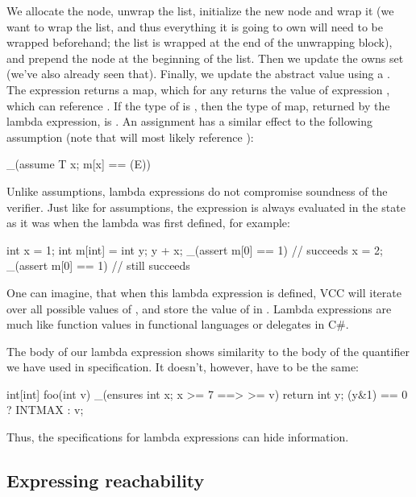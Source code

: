 \noindent
We allocate the node, unwrap the list, initialize the new node
and wrap it (we want to wrap the list, and thus everything it is going to own will
need to be wrapped beforehand; the list is wrapped at the end of the 
unwrapping block), and
prepend the node at the beginning of the list.
Then we update the owns set (we've also already seen that).
Finally, we update the abstract value using a .
The expression  returns a map, which for
any  returns the value of expression ,
which can reference .
If the type of  is , then the type of map, returned by the
lambda expression, is .
An assignment  has a similar effect to
the following assumption (note that  will most likely reference ):
\begin{VCC}
_(assume \forall T x; m[x] == (E))
\end{VCC}
\noindent
Unlike assumptions, lambda expressions do not compromise 
soundness of the verifier.
Just like for assumptions,
the expression is always evaluated in the state as it was
when the lambda was first defined, for example:
\begin{VCC}
int x = 1;
int m[int] = \lambda int y; y + x;
_(assert m[0] == 1) // succeeds
x = 2;
_(assert m[0] == 1) // still succeeds
\end{VCC}
One can imagine, that when this lambda expression is defined,
VCC will iterate over all possible values of ,
and store the value of  in .
Lambda expressions are much like function values in functional
languages or delegates in C\#.

\begin{note}
The body of our lambda expression shows similarity to the body
of the quantifier we have used in specification.
It doesn't, however, have to be the same:
\begin{VCC}
int[int] foo(int v)
  _(ensures \forall int x; x >= 7 ==> \result[x] >= v)
{
  return \lambda int y; (y&1) == 0 ? INTMAX : v;
}
\end{VCC}
Thus, the specifications for lambda expressions can hide information.
\end{note}


\subsection{Expressing reachability}


